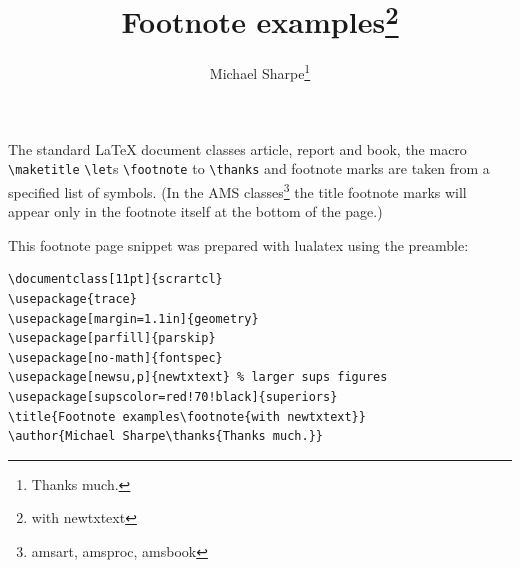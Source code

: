 \if1\zz\documentclass[11pt]{article}
\title{Footnote examples\footnote{with newtxtext}}
\author{Michael Sharpe\thanks{Thanks much.}}
\def\tt{\normalfont\ttfamily}
\begin{document}
\maketitle
\thispagestyle{empty}
%



The standard LaTeX document classes {\tt article}, {\tt report} and {\tt book}, the macro \verb|\maketitle| \verb|\let|s \verb|\footnote| to \verb|\thanks| and footnote marks are taken from a specified list of symbols. (In the AMS classes\footnote{amsart, amsproc, amsbook} the title footnote marks will appear only in the footnote itself at the bottom of the page.)\\

\centerline{
}
This footnote page snippet was prepared with {\tt lualatex} using the preamble:
\begin{verbatim}
\documentclass[11pt]{scrartcl}  
\usepackage{trace}
\usepackage[margin=1.1in]{geometry}
\usepackage[parfill]{parskip}
\usepackage[no-math]{fontspec}
\usepackage[newsu,p]{newtxtext} % larger sups figures
\usepackage[supscolor=red!70!black]{superiors}
\title{Footnote examples\footnote{with newtxtext}}
\author{Michael Sharpe\thanks{Thanks much.}}
\end{verbatim}


 
\end{document}

